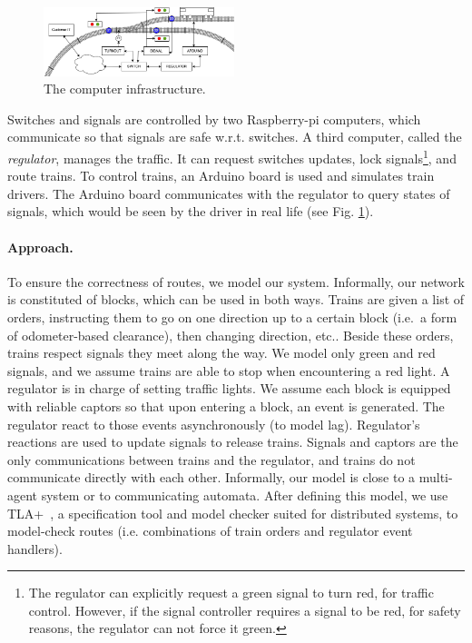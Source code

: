 \documentclass[runningheads]{llncs}
\begin{document}
\begin{figure}
	\vspace{-6mm}
	\includegraphics[height=20mm]{TrainSchema.png}
	\caption{The computer infrastructure.}
	\label{fig:computers}
\end{figure}

Switches and signals are controlled by two Raspberry-pi computers, which communicate so that signals are safe w.r.t. switches. A third computer, called the \emph{regulator}, manages the traffic. It can request switches updates, lock signals\footnote{The regulator can explicitly request a green signal to turn red, for traffic control. However, if the signal controller requires a signal to be red, for safety reasons, the regulator can not force it green.}, and route trains. To control trains, an Arduino board is used and simulates train drivers. The Arduino board communicates with the regulator to query states of signals, which would be seen by the driver in real life (see Fig. \ref{fig:computers}). 

\paragraph{Approach.}

To ensure the correctness of routes, we model our system. Informally, our network is constituted of blocks, which can be used in both ways. Trains are given a list of orders, instructing them to go on one direction up to a certain block (i.e.\ a form of odometer-based clearance), then changing direction, etc.. Beside these orders, trains respect signals they meet along the way. We model only green and red signals, and we assume trains are able to stop when encountering a red light. A regulator is in charge of setting traffic lights. We assume each block is equipped with reliable captors so that upon entering a block, an event is generated. The regulator react to those events asynchronously (to model lag). Regulator's reactions are used to update signals to release trains. Signals and captors are the only communications between trains and the regulator, and trains do not communicate directly with each other. Informally, our model is close to a multi-agent system or to communicating automata. 
After defining this model, we use TLA+~\cite{Lamport}, a specification tool and model checker suited for distributed systems, to model-check routes (i.e. combinations of train orders and regulator event handlers). 
\end{document}
